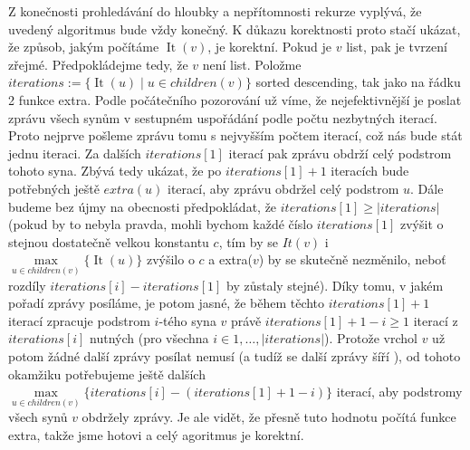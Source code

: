 \documentclass[12pt,a4paper]{article}
\theoremstyle{plain}
\newcommand{\It}{\operatorname{It}}
\begin{document}
Z konečnosti prohledávání do hloubky a nepřítomnosti rekurze vyplývá, že uvedený algoritmus bude vždy konečný. K důkazu korektnosti proto stačí ukázat, že způsob, jakým počítáme $ \It(v) $, je korektní. Pokud je $ v $ list, pak je tvrzení zřejmé. Předpokládejme tedy, že $ v $ není list. Položme $iterations :=  \{ \It(u) \mid u \in children(v) \}$ sorted descending, tak jako na řádku 2 funkce extra.  Podle počátečního pozorování už víme, že nejefektivnější je poslat zprávu všech synům v sestupném uspořádání podle počtu nezbytných iterací. Proto nejprve pošleme zprávu tomu s nejvyšším počtem iterací, což nás bude stát jednu iteraci. Za dalších $iterations[1]$ iterací pak zprávu obdrží celý podstrom tohoto syna. Zbývá tedy ukázat, že po $iterations[1]+1$ iteracích bude potřebných ještě $extra(u)$ iterací, aby zprávu obdržel celý podstrom $u$. Dále budeme bez újmy na obecnosti předpokládat, že $iterations[1]\geq |iterations|$ (pokud by to nebyla pravda, mohli bychom každé číslo $iterations[1]$ zvýšit o stejnou dostatečně velkou konstantu $c$, tím by se $It(v)$ i $\max\limits_{u \in children(v)}\{\It(u)\}$ zvýšilo o $c$ a extra($v$) by se skutečně nezměnilo, neboť rozdíly $iterations[i]-iterations[1]$ by zůstaly stejné). Díky tomu, v jakém pořadí zprávy posíláme, je potom jasné, že během těchto $iterations[1]+1$ iterací zpracuje podstrom $i$-tého syna $v$ právě $iterations[1]+1-i\geq 1$ iterací z $iterations[i]$ nutných (pro všechna $i\in{1,\dots,|iterations|}$). Protože vrchol $v$ už potom žádné další zprávy posílat nemusí (a tudíž se další zprávy šíří ), od tohoto okamžiku potřebujeme ještě dalších $\max\limits_{u \in children(v)}\{iterations[i]-(iterations[1]+1-i)\}$ iterací, aby podstromy všech synů $v$ obdržely zprávy. Je ale vidět, že přesně tuto hodnotu počítá funkce extra, takže jsme hotovi a celý agoritmus je korektní.\\


\end{document}
